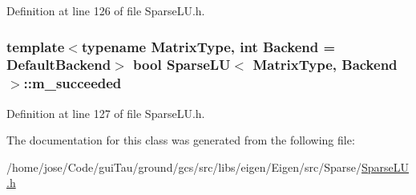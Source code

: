 Definition at line 126 of file Sparse\-L\-U.\-h.

\hypertarget{class_sparse_l_u_a6d8cbd9b21ff099a6eacf621171f13c6}{
\subsubsection[{m\-\_\-succeeded}]{\setlength{\rightskip}{0pt plus 5cm}template$<$typename Matrix\-Type, int Backend = Default\-Backend$>$ bool {\bf Sparse\-L\-U}$<$ Matrix\-Type, Backend $>$\-::m\-\_\-succeeded\hspace{0.3cm}{\ttfamily [protected]}}}\label{class_sparse_l_u_a6d8cbd9b21ff099a6eacf621171f13c6}


Definition at line 127 of file Sparse\-L\-U.\-h.



The documentation for this class was generated from the following file\-:\begin{DoxyCompactItemize}
\item 
/home/jose/\-Code/gui\-Tau/ground/gcs/src/libs/eigen/\-Eigen/src/\-Sparse/\hyperlink{_sparse_l_u_8h}{Sparse\-L\-U.\-h}\end{DoxyCompactItemize}
